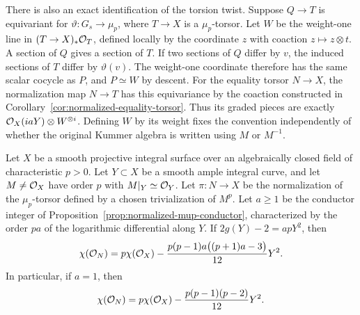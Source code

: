 There is also an exact identification of the torsion twist.
Suppose $Q\to T$ is equivariant for $\vartheta:G_s\to\mu_p$,
where $T\to X$ is a $\mu_p$-torsor. Let $W$ be the weight-one
line in $(T\to X)_*\mathcal O_T$, defined locally by the coordinate
$z$ with coaction $z\mapsto z\otimes t$.
A section of $Q$ gives a section of $T$. If two sections of $Q$
differ by $v$, the induced sections of $T$ differ by $\vartheta(v)$.
The weight-one coordinate therefore has the same scalar cocycle
as $P$, and $P\simeq W$ by descent.
For the equality torsor $N\to X$, the normalization map $N\to T$
has this equivariance by the coaction constructed in
Corollary~\ref{cor:normalized-equality-torsor}.
Thus its graded pieces are exactly
$\mathcal O_X(iaY)\otimes W^{\otimes i}$.
Defining $W$ by its weight fixes the convention independently of
whether the original Kummer algebra is written using $M$ or $M^{-1}$.

\begin{corollary}\label{cor:normalized-equality-euler}
Let $X$ be a smooth projective integral surface over an algebraically
closed field of characteristic $p>0$. Let $Y\subset X$ be a smooth
ample integral curve, and let $M\ne\mathcal O_X$ have order $p$ with
$M|_Y\simeq\mathcal O_Y$. Let $\pi:N\to X$ be the normalization of the
$\mu_p$-torsor defined by a chosen trivialization of $M^p$.
Let $a\geq1$ be the conductor integer of
Proposition~\ref{prop:normalized-mup-conductor}, characterized by
the order $pa$ of the logarithmic differential along $Y$.
If $2g(Y)-2=apY^2$, then
\begin{equation}\label{eq:normalized-equality-euler}
 \chi(\mathcal O_N)=p\chi(\mathcal O_X)
 -\frac{p(p-1)a\bigl((p+1)a-3\bigr)}{12}Y^2.
\end{equation}
In particular, if $a=1$, then
\begin{equation}\label{eq:normalized-smallest-equality-euler}
 \chi(\mathcal O_N)=p\chi(\mathcal O_X)
 -\frac{p(p-1)(p-2)}{12}Y^2.
\end{equation}
\end{corollary}

